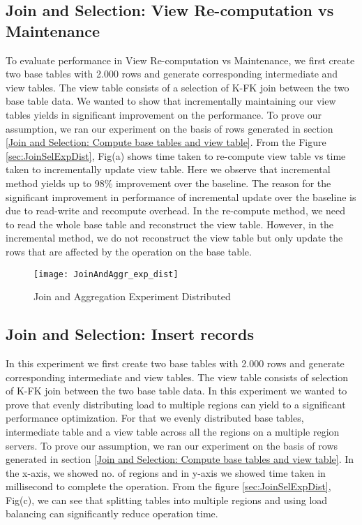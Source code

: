 \documentclass[11pt,a4paper,bibtotoc,idxtotoc,headsepline,footsepline,footexclude,BCOR12mm,DIV13]{scrbook}
\begin{document}
\subsection{Join and Selection: View Re-computation vs Maintenance}
\label{Join and Selection: View Re-computation vs Maintenance Distributed}

To evaluate performance in View Re-computation vs Maintenance, we first create two base tables with 2.000 rows and generate corresponding intermediate and view tables. The view table consists of a selection of K-FK join between the two base table data. We wanted to show that incrementally maintaining our view tables yields in significant improvement on the performance. To prove our assumption, we ran our experiment on the basis of rows generated in section \ref{Join and Selection: Compute base tables and view table}. From the Figure \ref{sec:JoinSelExpDist}, Fig(a) shows time taken to re-compute view table vs time taken to incrementally update view table. Here we observe that incremental method yields up to 98\% improvement over the baseline. The reason for the significant improvement in performance of incremental update over the baseline is due to read-write and recompute overhead. In the re-compute method, we need to read the whole base table and
reconstruct the view table. However, in the incremental method, we do not reconstruct the view table but only update the rows that are affected by the operation on the base table. 

\begin{figure}
	\centering
	\texttt{[image: JoinAndAggr\_exp\_dist]}
	\caption{Join and Aggregation Experiment Distributed}
	\label{sec:JoinAggrExpDist}
	
\end{figure} 
\newpage



\subsection{Join and Selection: Insert records}
\label{Join and Selection: Insert Records Distributed}

In this experiment we first create two base tables with 2.000 rows and generate corresponding intermediate and view tables. The view table consists of selection of K-FK join between the two base table data. In this experiment we wanted to prove that evenly distributing load to multiple regions can yield to a significant performance optimization. For that we evenly distributed base tables, intermediate table and a view table across all the regions on a multiple region servers.  
To prove our assumption, we ran our experiment on the basis of rows generated in section \ref{Join and Selection: Compute base tables and view table}. In the x-axis, we showed no. of regions and in y-axis we showed time taken in millisecond to complete the operation. From the figure \ref{sec:JoinSelExpDist}, Fig(c), we can see that splitting tables into multiple regions and using load balancing can significantly reduce operation time.
\end{document}
